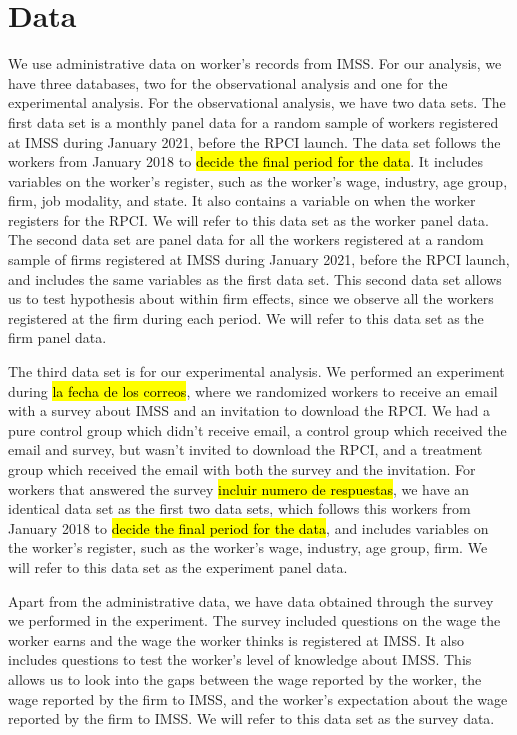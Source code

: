 \documentclass[oneside,11pt]{article}
\begin{document}
\section{Data}

We use administrative data on worker's records from IMSS. For our analysis, we have three databases, two for the observational analysis and one for the experimental analysis. For the observational analysis, we have two data sets. The first data set is a monthly panel data for a random sample of workers registered at IMSS during January 2021, before the RPCI launch. The data set follows the workers from January 2018 to \hl{decide the final period for the data}. It includes variables on the worker's register, such as the worker's wage, industry, age group, firm, job modality, and state. It also contains a variable on when the worker registers for the RPCI. We will refer to this data set as the worker panel data. The second data set are panel data for all the workers registered at a random sample of firms registered at IMSS during January 2021, before the RPCI launch, and includes the same variables as the first data set. This second data set allows us to test hypothesis about within firm effects, since we observe all the workers registered at the firm during each period. We will refer to this data set as the firm panel data.

The third data set is for our experimental analysis. We performed an experiment during \hl{la fecha de los correos}, where we randomized workers to receive an email with a survey about IMSS and an invitation to download the RPCI. We had a pure control group which didn't receive email, a control group which received the email and survey, but wasn't invited to download the RPCI, and a treatment group which received the email with both the survey and the invitation. For workers that answered the survey \hl{incluir numero de respuestas}, we have an identical data set as the first two data sets, which follows this workers from January 2018 to \hl{decide the final period for the data}, and includes variables on the worker's register, such as the worker's wage, industry, age group, firm. We will refer to this data set as the experiment panel data.

Apart from the administrative data, we have data obtained through the survey we performed in the experiment. The survey included questions on the wage the worker earns and the wage the worker thinks is registered at IMSS. It also includes questions to test the worker's level of knowledge about IMSS. This allows us to look into the gaps between the wage reported by the worker, the wage reported by the firm to IMSS, and the worker's expectation about the wage reported by the firm to IMSS. We will refer to this data set as the survey data.
\end{document}
